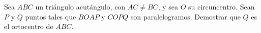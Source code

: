 Sea $ABC$ un triángulo acutángulo, con $AC \neq BC$, y sea $O$ su circuncentro. Sean $P$ y $Q$ puntos tales que $BOAP$ y $COPQ$ son paralelogramos. Demostrar que $Q$ es el ortocentro de $ABC$.
